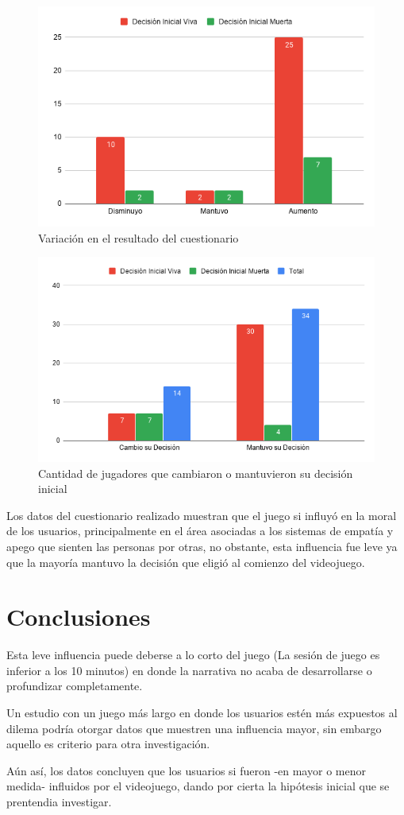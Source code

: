\documentclass[12pt]{article}
\begin{document}
\begin{figure}[h]
    \centering
    \includegraphics[scale=.7]{imgs/resultado-encuesta-separado.png}
    \caption*{Variación en el resultado del cuestionario}
\end{figure}

\begin{figure}[h]
    \centering
    \includegraphics[scale=.7]{imgs/resultado-decision.png}
    \caption*{Cantidad de jugadores que cambiaron o mantuvieron su decisión inicial}
\end{figure}

Los datos del cuestionario realizado muestran que el juego si influyó en la moral de los usuarios, principalmente en el área asociadas a los sistemas de empatía y apego que sienten las personas por otras, no obstante, esta influencia fue leve ya que la mayoría mantuvo la decisión que eligió al comienzo del videojuego.

\section{Conclusiones}
Esta leve influencia puede deberse a lo corto del juego (La sesión de juego es inferior a los 10 minutos) en donde la narrativa no acaba de desarrollarse o profundizar completamente.

Un estudio con un juego más largo en donde los usuarios estén más expuestos al dilema podría otorgar datos que muestren una influencia mayor, sin embargo aquello es criterio para otra investigación.

Aún así, los datos concluyen que los usuarios si fueron -en mayor o menor medida- influidos por el videojuego, dando por cierta la hipótesis inicial que se prentendia investigar.
\end{document}
